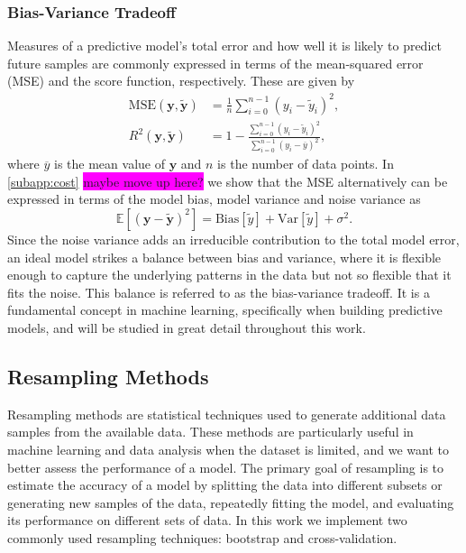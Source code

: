\documentclass[aps,pra,english,notitlepage,reprint,nofootinbib]{revtex4-1}  %
\begin{document}
\subsubsection{Bias-Variance Tradeoff}
Measures of a predictive model's total error and how well it is likely to predict future samples are commonly expressed in terms of the mean-squared error (MSE) and the score function, respectively. These are given by
\begin{align}
  \text{MSE}(\mathbf{y},\mathbf{\tilde{y}}) &= \frac{1}{n}\sum_{i=0}^{n-1}\left(y_i-\tilde{y}_i\right)^2, \label{eq:MSE}
  \\
  R^2(\mathbf{y},\mathbf{\tilde{y}}) &= 1 -\frac{\sum_{i=0}^{n-1}\left(y_i-\tilde{y}_i\right)^2}{\sum_{i=0}^{n-1}\left(y_i-\overline{y}\right)^2}, \label{eq:R2}
\end{align}
where $\overline{y}$ is the mean value of $\mathbf{y}$ and $n$ is the number of data points. In \cref{subapp:cost} \colorbox{magenta}{maybe move up here?} we show that the MSE alternatively can be expressed in terms of the model bias, model variance and noise variance as 
\begin{equation}
  \mathbb{E}\left[(\mathbf{y}-\mathbf{\tilde{y}})^2 \right] = \text{Bias}[\tilde{y}] + \text{Var}[\tilde{y}] + \sigma^2. \label{eq:model error}
\end{equation}
Since the noise variance adds an irreducible contribution to the total model error, an ideal model strikes a balance between bias and variance, where it is flexible enough to capture the underlying patterns in the data but not so flexible that it fits the noise. This balance is referred to as the bias-variance tradeoff. It is a fundamental concept in machine learning, specifically when building predictive models, and will be studied in great detail throughout this work.


\subsection{Resampling Methods}
Resampling methods are statistical techniques used to generate additional data samples from the available data. These methods are particularly useful in machine learning and data analysis when the dataset is limited, and we want to better assess the performance of a model. The primary goal of resampling is to estimate the accuracy of a model by splitting the data into different subsets or generating new samples of the data, repeatedly fitting the model, and evaluating its performance on different sets of data. In this work we implement two commonly used resampling techniques: bootstrap and cross-validation.
\end{document}
